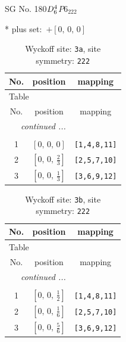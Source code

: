 \documentclass[fleqn,8pt]{jsarticle}
\begin{document}
\setcounter{MaxMatrixCols}{32}

\renewcommand{\tablename}{Table~}
\renewcommand{\figurename}{Figure~}
\begin{center}
\LARGE
SG No. 180\quad$D_{\rm 6}^{4}$\quad$P6_222$\quad[ hexagonal ]
\end{center}
* plus set:\,\,\,$+\left[ 0,\, 0,\, 0 \right]$
\renewcommand{\arraystretch}{1.2}
\begin{longtable}{ccc}
\caption{Wyckoff site: {\tt 3a}, site symmetry: {\tt 222}}
 \\
 \hline \hline
No. & position & mapping \\ \hline \endfirsthead

\multicolumn{2}{l}{\tablename\ \thetable{}} \\
 \hline \hline
No. & position & mapping \\ \hline \endhead

 \hline \hline
\multicolumn{2}{r}{\footnotesize\it continued ...} \\ \endfoot

 \hline \hline
\multicolumn{2}{r}{} \\ \endlastfoot

1 & $\left[ 0,\, 0,\, 0 \right]$ & {\tt [1,4,8,11]} \\ \hline
2 & $\left[ 0,\, 0,\, \frac{2}{3} \right]$ & {\tt [2,5,7,10]} \\ \hline
3 & $\left[ 0,\, 0,\, \frac{1}{3} \right]$ & {\tt [3,6,9,12]} \\
\end{longtable}
\renewcommand{\arraystretch}{1.2}
\begin{longtable}{ccc}
\caption{Wyckoff site: {\tt 3b}, site symmetry: {\tt 222}}
 \\
 \hline \hline
No. & position & mapping \\ \hline \endfirsthead

\multicolumn{2}{l}{\tablename\ \thetable{}} \\
 \hline \hline
No. & position & mapping \\ \hline \endhead

 \hline \hline
\multicolumn{2}{r}{\footnotesize\it continued ...} \\ \endfoot

 \hline \hline
\multicolumn{2}{r}{} \\ \endlastfoot

1 & $\left[ 0,\, 0,\, \frac{1}{2} \right]$ & {\tt [1,4,8,11]} \\ \hline
2 & $\left[ 0,\, 0,\, \frac{1}{6} \right]$ & {\tt [2,5,7,10]} \\ \hline
3 & $\left[ 0,\, 0,\, \frac{5}{6} \right]$ & {\tt [3,6,9,12]} \\
\end{longtable}
\end{document}
